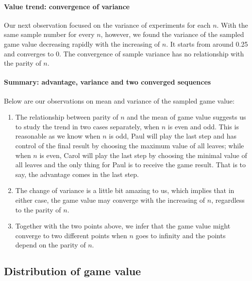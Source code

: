 \documentclass[a4paper,english]{article}
\begin{document}
\begin{spacing}{1.4}
\paragraph{Value trend: convergence of variance}
Our next observation focused on the variance of experiments for each $n$. With the same sample number for every $n$, however, we found the variance of the sampled game value decreasing rapidly with the increasing of $n$. It starts from around 0.25 and converges to 0. The convergence of sample variance has no relationship with the parity of $n$.
\paragraph{Summary: advantage, variance and two converged sequences}
Below are our observations on mean and variance of the sampled game value:
\begin{enumerate}
    \item The relationship between parity of $n$ and the mean of game value suggests us to study the trend in two cases separately, when $n$ is even and odd. This is reasonable as we know when $n$ is odd, Paul will play the last step and has control of the final result by choosing the maximum value of all leaves; while when $n$ is even, Carol will play the last step by choosing the minimal value of all leaves and the only thing for Paul is to receive the game result. That is to say, the advantage comes in the last step.
    \item The change of variance is a little bit amazing to us, which implies that in either case, the game value may converge with the increasing of $n$, regardless to the parity of $n$.
    \item Together with the two points above, we infer that the game value might converge to two different points when $n$ goes to infinity and the points depend on the parity of $n$.
\end{enumerate}

\subsection{Distribution of game value}


\end{spacing}
\end{document}
